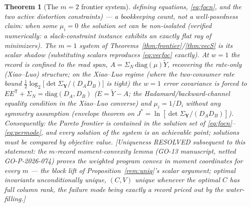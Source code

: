 \documentclass[11pt]{article}
\newtheorem{theorem}{Theorem}\newtheorem{corollary}{Corollary}
\begin{document}
\begin{theorem}[The $m=2$ frontier system]
defining equations, \eqref{eq:focn}, and the two active distortion
constraints) --- a bookkeeping count, not a well-posedness claim: when
some $\mu_i=0$ the solution set can be non-isolated (verified
numerically: a slack-constraint instance exhibits an exactly flat ray of
minimizers). The $m{=}1$ system of
Theorems~\ref{thm:frontier}/\ref{thm:vecS} is its scalar shadow
(substituting scalars reproduces \eqref{eq:vecfoc} exactly). At $w=1$
the record is confined to the read span, $A=\Sigma_N\,\mathrm{diag}(\mu)
\widetilde Y$, recovering the rate-only (Xiao--Luo) structure; on the
Xiao--Luo regime (where the two-consumer rate bound
$\tfrac12\log_2\!\bigl[\det\Sigma_{\mathbf Y}/(D_AD_B)\bigr]$ is tight)
the $w{=}1$ error covariance is forced to
$EE^{\mathsf T}+\Sigma_N=\mathrm{diag}(D_A,D_B)$ ($E=\widetilde Y-A$; the
Hadamard/backward-channel equality condition in the Xiao--Luo converse)
and $\mu_i=1/D_i$ \emph{without any symmetry assumption} (envelope
theorem on $J^*=\ln[\det\Sigma_{\mathbf Y}/(D_AD_B)]$).
Consequently: the Pareto frontier is \emph{contained in} the solution
set of \eqref{eq:focn}--\eqref{eq:permode}, and every solution of the
system is an achievable point; solutions must be compared by objective
value. [Uniqueness RESOLVED subsequent to this statement: the
$m$-record moment-convexity lemma (GO-13 manuscript, netted
GO-P-2026-074) proves the weighted program convex in moment
coordinates for every $m$ --- the block lift of
Proposition~\ref{rem:uniq}'s scalar argument; optimal invariants
unconditionally unique, $(C,V)$ unique whenever the optimal $C$ has
full column rank, the failure mode being exactly a record
priced out by the water-filling.]
\end{theorem}
\end{document}
